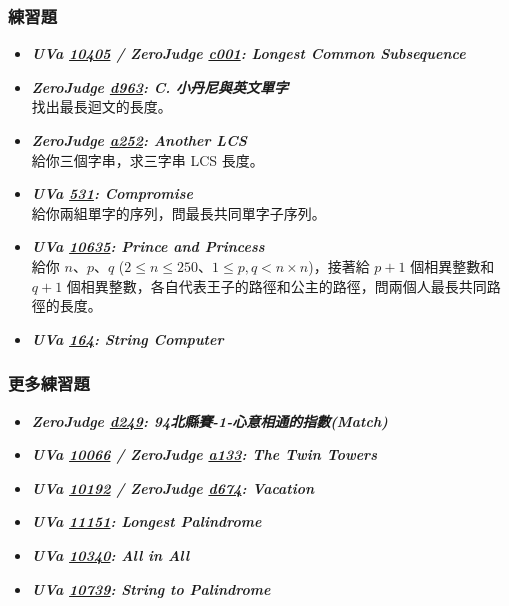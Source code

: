 \subsubsection*{練習題}
\begin{itemize}[label={\Checkmark}]
\item \textbf{\textit{UVa \href{http://uva.onlinejudge.org/external/104/10405.html}{10405} / ZeroJudge \href{http://zerojudge.tw/ShowProblem?problemid=c001}{c001}: Longest Common Subsequence}}\\

\item \textbf{\textit{ZeroJudge \href{http://zerojudge.tw/ShowProblem?problemid=d963}{d963}: C. 小丹尼與英文單字}}\\
找出最長迴文的長度。
\item \textbf{\textit{ZeroJudge \href{http://zerojudge.tw/ShowProblem?problemid=a252}{a252}: Another LCS}}\\
給你三個字串，求三字串 LCS 長度。
\item \textbf{\textit{UVa \href{http://uva.onlinejudge.org/external/5/531.html}{531}: Compromise}}\\
給你兩組單字的序列，問最長共同單字子序列。
\item \textbf{\textit{UVa \href{http://uva.onlinejudge.org/external/106/10635.html}{10635}: Prince and Princess}}\\
給你 $n$、$p$、$q$ ($2\leq{n}\leq{250}$、$1\leq{p,q}<{n\times{n}}$)，接著給 $p+1$ 個相異整數和 $q+1$ 個相異整數，各自代表王子的路徑和公主的路徑，問兩個人最長共同路徑的長度。
\item \textbf{\textit{UVa \href{http://uva.onlinejudge.org/external/1/164.html}{164}: String Computer}}\\

\end{itemize}
\subsubsection*{更多練習題}
\begin{itemize}[label={\PencilLeftDown}]
\item \textbf{\textit{ZeroJudge \href{http://zerojudge.tw/ShowProblem?problemid=d249}{d249}: 94北縣賽-1-心意相通的指數(Match)}}
\item \textbf{\textit{UVa \href{http://uva.onlinejudge.org/external/100/10066.html}{10066} / ZeroJudge \href{http://zerojudge.tw/ShowProblem?problemid=a133}{a133}: The Twin Towers}}
\item \textbf{\textit{UVa \href{http://uva.onlinejudge.org/external/101/10192.html}{10192} / ZeroJudge \href{http://zerojudge.tw/ShowProblem?problemid=d674}{d674}: Vacation}}
\item \textbf{\textit{UVa \href{http://uva.onlinejudge.org/external/111/11151.html}{11151}: Longest Palindrome}}
\item \textbf{\textit{UVa \href{http://uva.onlinejudge.org/external/103/10340.html}{10340}: All in All}}
\item \textbf{\textit{UVa \href{http://uva.onlinejudge.org/external/107/10739.html}{10739}: String to Palindrome}}
\end{itemize}